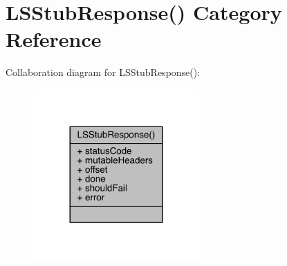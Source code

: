 \hypertarget{category_l_s_stub_response_07_08}{\section{L\-S\-Stub\-Response() Category Reference}
\label{category_l_s_stub_response_07_08}
}


Collaboration diagram for L\-S\-Stub\-Response()\-:\nopagebreak
\begin{figure}[H]
\begin{center}
\leavevmode
\includegraphics[width=180pt]{category_l_s_stub_response_07_08__coll__graph}
\end{center}
\end{figure}
